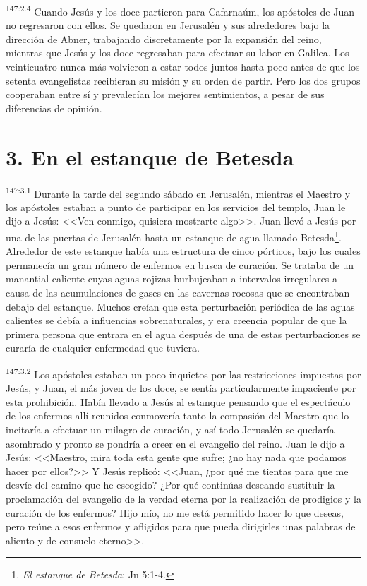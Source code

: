 \par 
\textsuperscript{147:2.4} Cuando Jesús y los doce partieron para Cafarnaúm, los apóstoles de Juan no regresaron con ellos. Se quedaron en Jerusalén y sus alrededores bajo la dirección de Abner, trabajando discretamente por la expansión del reino, mientras que Jesús y los doce regresaban para efectuar su labor en Galilea. Los veinticuatro nunca más volvieron a estar todos juntos hasta poco antes de que los setenta evangelistas recibieran su misión y su orden de partir. Pero los dos grupos cooperaban entre sí y prevalecían los mejores sentimientos, a pesar de sus diferencias de opinión.

\section*{3. En el estanque de Betesda}
\par 
\textsuperscript{147:3.1} Durante la tarde del segundo sábado en Jerusalén, mientras el Maestro y los apóstoles estaban a punto de participar en los servicios del templo, Juan le dijo a Jesús: <<Ven conmigo, quisiera mostrarte algo>>. Juan llevó a Jesús por una de las puertas de Jerusalén hasta un estanque de agua llamado Betesda\footnote{\textit{El estanque de Betesda}: Jn 5:1-4.}. Alrededor de este estanque había una estructura de cinco pórticos, bajo los cuales permanecía un gran número de enfermos en busca de curación. Se trataba de un manantial caliente cuyas aguas rojizas burbujeaban a intervalos irregulares a causa de las acumulaciones de gases en las cavernas rocosas que se encontraban debajo del estanque. Muchos creían que esta perturbación periódica de las aguas calientes se debía a influencias sobrenaturales, y era creencia popular de que la primera persona que entrara en el agua después de una de estas perturbaciones se curaría de cualquier enfermedad que tuviera.

\par 
\textsuperscript{147:3.2} Los apóstoles estaban un poco inquietos por las restricciones impuestas por Jesús, y Juan, el más joven de los doce, se sentía particularmente impaciente por esta prohibición. Había llevado a Jesús al estanque pensando que el espectáculo de los enfermos allí reunidos conmovería tanto la compasión del Maestro que lo incitaría a efectuar un milagro de curación, y así todo Jerusalén se quedaría asombrado y pronto se pondría a creer en el evangelio del reino. Juan le dijo a Jesús: <<Maestro, mira toda esta gente que sufre; ¿no hay nada que podamos hacer por ellos?>> Y Jesús replicó: <<Juan, ¿por qué me tientas para que me desvíe del camino que he escogido? ¿Por qué continúas deseando sustituir la proclamación del evangelio de la verdad eterna por la realización de prodigios y la curación de los enfermos? Hijo mío, no me está permitido hacer lo que deseas, pero reúne a esos enfermos y afligidos para que pueda dirigirles unas palabras de aliento y de consuelo eterno>>.

